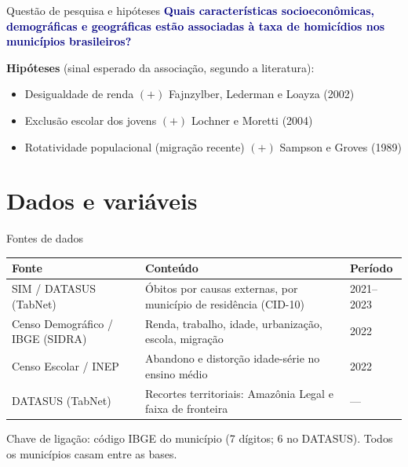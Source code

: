 \documentclass[aspectratio=169,11pt,xcolor=table]{beamer}
\begin{document}
\begin{frame}{Questão de pesquisa e hipóteses}
\textcolor{navy}{\textbf{Quais características socioeconômicas, demográficas e geográficas estão associadas à taxa de homicídios nos municípios brasileiros?}}\par
\vspace{0.6em}
\small
\textbf{Hipóteses} (sinal esperado da associação, segundo a literatura):
\begin{itemize}\small
\item[\textbf{H1}] Desigualdade de renda $(+)$ \hfill {\footnotesize\color{black!60}Fajnzylber, Lederman e Loayza (2002)}
\item[\textbf{H2}] Exclusão escolar dos jovens $(+)$ \hfill {\footnotesize\color{black!60}Lochner e Moretti (2004)}
\item[\textbf{H3}] Rotatividade populacional (migração recente) $(+)$ \hfill {\footnotesize\color{black!60}Sampson e Groves (1989)}
\end{itemize}
\end{frame}

\section[Dados]{Dados e variáveis}
\begin{frame}{Fontes de dados}
\footnotesize
\renewcommand{\arraystretch}{1.35}
\begin{tabularx}{\textwidth}{@{}l>{\raggedright\arraybackslash}Xl@{}}
\toprule
\textbf{Fonte} & \textbf{Conteúdo} & \textbf{Período}\\
\midrule
SIM / DATASUS (TabNet) & Óbitos por causas externas, por município de residência (CID-10) & 2021--2023\\
Censo Demográfico / IBGE (SIDRA) & Renda, trabalho, idade, urbanização, escola, migração & 2022\\
Censo Escolar / INEP & Abandono e distorção idade-série no ensino médio & 2022\\
DATASUS (TabNet) & Recortes territoriais: Amazônia Legal e faixa de fronteira & ---\\
\bottomrule
\end{tabularx}
\vspace{0.8em}

\small Chave de ligação: código IBGE do município (7 dígitos; 6 no DATASUS). Todos os municípios casam entre as bases.
\end{frame}
\end{document}
